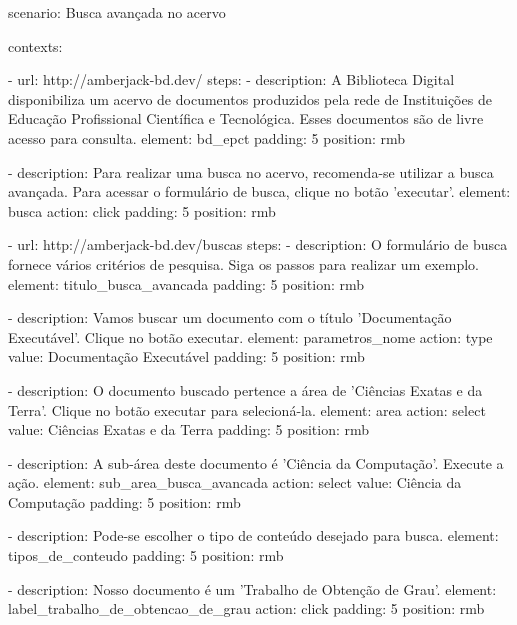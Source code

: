 scenario: Busca avançada no acervo

contexts:

    - url: http://amberjack-bd.dev/
      steps:
          - description:
              A Biblioteca Digital disponibiliza um acervo
              de documentos produzidos pela rede de Instituições
              de Educação Profissional Científica e Tecnológica.
              Esses documentos são de livre acesso para consulta.
            element: bd_epct
            padding: 5
            position: rmb

          - description:
              Para realizar uma busca no acervo, recomenda-se
              utilizar a busca avançada.
              Para acessar o formulário de busca, clique no
              botão 'executar'.
            element: busca
            action: click
            padding: 5
            position: rmb

    - url: http://amberjack-bd.dev/buscas
      steps:
          - description:
              O formulário de busca fornece vários critérios
              de pesquisa. Siga os passos para realizar um exemplo.
            element: titulo_busca_avancada
            padding: 5
            position: rmb

          - description:
              Vamos buscar um documento com o título
              'Documentação Executável'.
              Clique no botão executar.
            element: parametros_nome
            action: type
            value: Documentação Executável
            padding: 5
            position: rmb

          - description:
              O documento buscado pertence a área de
              'Ciências Exatas e da Terra'.
              Clique no botão executar para selecioná-la.
            element: area
            action: select
            value: Ciências Exatas e da Terra
            padding: 5
            position: rmb

          - description:
              A sub-área deste documento é
              'Ciência da Computação'. Execute a ação.
            element: sub_area_busca_avancada
            action: select
            value: Ciência da Computação
            padding: 5
            position: rmb

          - description:
              Pode-se escolher o tipo de conteúdo
              desejado para busca.
            element: tipos_de_conteudo
            padding: 5
            position: rmb

          - description: Nosso documento é um 'Trabalho de Obtenção de Grau'.
            element: label_trabalho_de_obtencao_de_grau
            action: click
            padding: 5
            position: rmb

